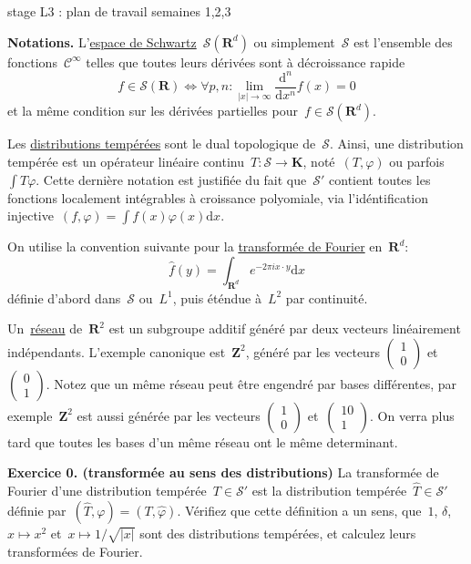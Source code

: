 \documentclass[a4paper,11pt]{article}
\def\ud{\mathrm{d}}
\def\R{\mathbf{R}}
\def\K{\mathbf{K}}
\def\S{\mathcal{S}}
\def\Z{\mathbf{Z}}
\begin{document}
\begin{center}\LARGE
stage L3 : plan de travail semaines 1,2,3
\end{center}

{\bf Notations.}
L'\underline{espace de Schwartz}~$\S(\R^d)$ ou simplement~$\S$ est l'ensemble
des fonctions~$\mathcal{C}^\infty$ telles que toutes leurs dérivées sont à
décroissance rapide
\[
	f\in\S(\R)
	\iff
	\forall p,n : \lim_{|x|\to\infty}\frac{\ud^n}{\ud x^n}f(x)=0
\]
et la même condition sur les dérivées partielles pour~$f\in\S(\R^d)$.

Les \underline{distributions tempérées} sont le dual topologique de~$\S$.
Ainsi, une distribution tempérée est un opérateur linéaire continu~$T:\S\to\K$,
noté~$(T,\varphi)$ ou parfois~$\int T\varphi$.  Cette dernière notation est
justifiée du fait que~$\S'$ contient toutes les fonctions localement
intégrables à croissance polyomiale, via l'idéntification
injective~$\left(f,\varphi\right)=\int f(x)\varphi(x)\ud x$.

On utilise la convention suivante pour la \underline{transformée de Fourier}
en~$\R^d$:
\[
	\widehat f(y)=\int_{\R^d}e^{-2\pi i x\cdot y}\ud x
\]
définie d'abord dans~$\S$ ou~$L^1$, puis éténdue à~$L^2$ par continuité.

Un~\underline{réseau} de~$\R^2$ est un subgroupe additif généré par deux
vecteurs linéairement indépendants.  L'exemple canonique est~$\Z^2$, généré par
les vecteurs $\left(\begin{smallmatrix}1\\0\end{smallmatrix}\right)$
et~$\left(\begin{smallmatrix}0\\1\end{smallmatrix}\right)$.  Notez que
un même réseau peut être engendré par bases différentes, par
exemple~$\Z^2$ est aussi générée par les vecteurs
$\left(\begin{smallmatrix}1\\0\end{smallmatrix}\right)$
et~$\left(\begin{smallmatrix}10\\1\end{smallmatrix}\right)$.
On verra plus tard que toutes les bases d'un même réseau ont le même
determinant.


{\bf Exercice 0. (transformée au sens des distributions)}
La transformée de Fourier d'une distribution tempérée~$T\in\S'$ est la
distribution tempérée~$\widehat T\in\S'$ définie par~$\left(\widehat
T,\varphi\right)=\left(T,\widehat\varphi\right)$.  Vérifiez que cette
définition a un sens, que~$1$, $\delta$, $x\mapsto x^2$
et~$x\mapsto1/\sqrt{|x|}$ sont des distributions tempérées, et calculez leurs
transformées de Fourier.
\end{document}

